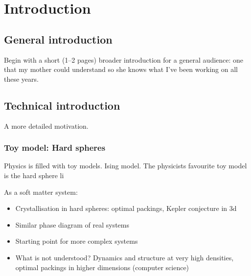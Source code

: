 \documentclass[11pt]{report}
\begin{document}
\chapter{Introduction}

\section{General introduction}
Begin with a short (1–2 pages) broader introduction for a general audience: one that my mother could understand so she knows what I’ve been working on all these years.

\section{Technical introduction}
A more detailed motivation.

\subsection{Toy model: Hard spheres}

Physics is filled with toy models.
Ising model.
The physicists favourite toy model is the hard sphere li

As a soft matter system:
\begin{itemize}
\item Crystallisation in hard spheres: optimal packings, Kepler conjecture in 3d
\item Similar phase diagram of real systems
\item Starting point for more complex systems
\item What is not understood? Dynamics and structure at very high densities, optimal packings in higher dimensions (computer science)
\end{itemize}
\end{document}
